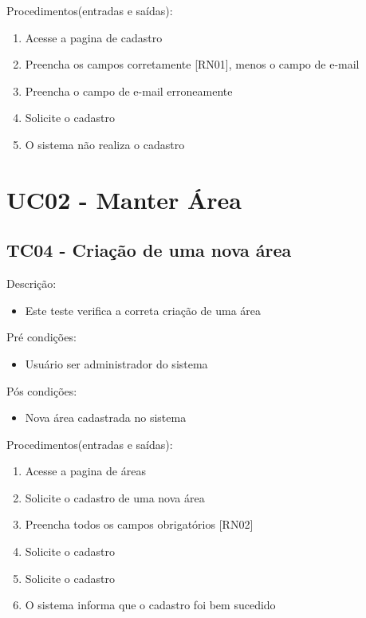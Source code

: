 \begin{apendicesenv}
Procedimentos(entradas e saídas):
\begin{enumerate}
  \item{Acesse a pagina de cadastro}
  \item{Preencha os campos corretamente [RN01], menos o campo de e-mail}
  \item{Preencha o campo de e-mail erroneamente}
  \item{Solicite o cadastro}
  \item{O sistema não realiza o cadastro}
\end{enumerate}




\section{UC02 - Manter Área}


\subsection{TC04 - Criação de uma nova área}


Descrição:
\begin{itemize}
  \item{Este teste verifica a correta criação de uma área}
\end{itemize}


Pré condições:
\begin{itemize}
  \item{Usuário ser administrador do sistema}
\end{itemize}


Pós condições:
\begin{itemize}
  \item{Nova área cadastrada no sistema}
\end{itemize}

Procedimentos(entradas e saídas):
\begin{enumerate}
  \item{Acesse a pagina de áreas}
  \item{Solicite o cadastro de uma nova área}
  \item{Preencha todos os campos obrigatórios [RN02]}
  \item{Solicite o cadastro}
  \item{Solicite o cadastro}
  \item{O sistema informa que o cadastro foi bem sucedido}
\end{enumerate}



























\end{apendicesenv}
